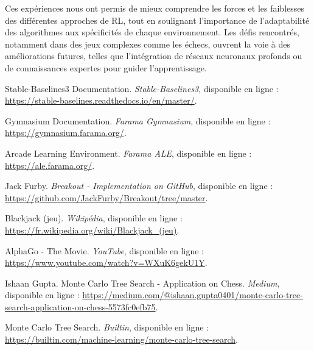 \documentclass{article}
\begin{document}
Ces expériences nous ont permis de mieux comprendre les forces et les faiblesses des différentes approches de RL, tout en soulignant l'importance de l'adaptabilité des algorithmes aux spécificités de chaque environnement. Les défis rencontrés, notamment dans des jeux complexes comme les échecs, ouvrent la voie à des améliorations futures, telles que l'intégration de réseaux neuronaux profonds ou de connaissances expertes pour guider l'apprentissage.

\begin{thebibliography}{9}

Stable-Baselines3 Documentation. \textit{Stable-Baselines3}, disponible en ligne :
\url{https://stable-baselines.readthedocs.io/en/master/}.

Gymnasium Documentation. \textit{Farama Gymnasium}, disponible en ligne :
\url{https://gymnasium.farama.org/}.

Arcade Learning Environment. \textit{Farama ALE}, disponible en ligne :
\url{https://ale.farama.org/}.

Jack Furby. \textit{Breakout - Implementation on GitHub}, disponible en ligne :
\url{https://github.com/JackFurby/Breakout/tree/master}.

Blackjack (jeu). \textit{Wikipédia}, disponible en ligne :
\url{https://fr.wikipedia.org/wiki/Blackjack_(jeu)}.

AlphaGo - The Movie. \textit{YouTube}, disponible en ligne :
\url{https://www.youtube.com/watch?v=WXuK6gekU1Y}.

Ishaan Gupta. Monte Carlo Tree Search - Application on Chess. \textit{Medium}, disponible en ligne :
\url{https://medium.com/@ishaan.gupta0401/monte-carlo-tree-search-application-on-chess-5573fc0efb75}.

Monte Carlo Tree Search. \textit{Builtin}, disponible en ligne :
\url{https://builtin.com/machine-learning/monte-carlo-tree-search}.

\end{thebibliography}
\end{document}
